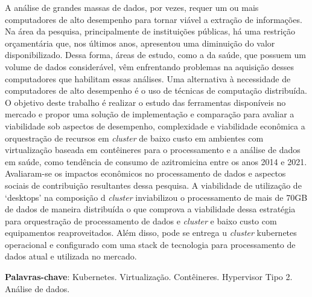 
\begin{resumo}
    A análise de grandes massas de dados, por vezes, requer um ou mais computadores de alto desempenho para tornar viável a extração de informações. Na área da pesquisa, principalmente de instituições públicas, há uma restrição orçamentária que, nos últimos anos, apresentou uma diminuição do valor disponibilizado. Dessa forma, áreas de estudo, como a da saúde, que possuem um volume de dados considerável, vêm enfrentando problemas na aquisição desses computadores que habilitam essas análises. Uma alternativa à necessidade de computadores de alto desempenho é o uso de técnicas de computação distribuída. O objetivo deste trabalho é realizar o estudo das ferramentas disponíveis no mercado e propor uma solução de implementação e comparação para avaliar a viabilidade sob aspectos de desempenho, complexidade e viabilidade econômica a orquestração de recursos em  \emph{cluster} de baixo custo em ambientes com virtualização baseada em contêineres para o processamento e a análise de dados em saúde, como tendência de consumo de azitromicina entre os anos 2014 e 2021. Avaliaram-se os impactos econômicos no processamento de dados e aspectos sociais de contribuição resultantes dessa pesquisa. A viabilidade de utilização de ‘desktops’ na composição d \emph{cluster} inviabilizou o processamento de mais de 70GB de dados de maneira distribuída o que comprova a viabilidade dessa estratégia para orquestração de processamento de dados e \emph{cluster} e baixo custo com equipamentos reaproveitados. Além disso, pode se entrega u \emph{cluster} kubernetes operacional e configurado com uma stack de tecnologia para processamento de dados  atual e utilizada no mercado.

    \textbf{Palavras-chave}: Kubernetes\textregistered. Virtualização. Contêineres. Hypervisor Tipo 2. Análise de dados.
\end{resumo}

